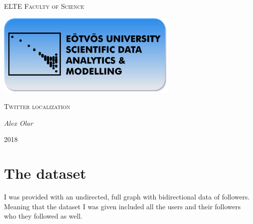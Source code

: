 \documentclass[a4paper,12pt]{article}
\begin{document}
\linespread{1.2}

\begin{titlepage}

	\centering
	{\scshape\LARGE ELTE Faculty of Science\par}
	\vspace{2cm}
	\includegraphics[width=0.66\textwidth]{./dslogo.png}
	\par\vspace{4cm}
	{\scshape\Large Twitter localization\par}
	\vspace{.5cm}
	{\large\itshape Alex Olar \par}
	\vfill
	{\large 2018 \par}

\end{titlepage}

\onehalfspacing

\begin{abstract}
	\par During the years the university has built a database 
	using Twitter's public API and collected more than 3 TB of
	data to analyze. I got access to this dataset and attempted
	to predict the location of users based on their followers'
	location.
	\par The problem itself is not a machine learning problem but
	an analytical approach and making assumptions about the behavior
	of users. Therefore I put an emphasis on visualization since the
	most crucial thing one does before any algorithmic solution
	is to analyze the visualized dataset.
\end{abstract}

\tableofcontents

\newpage

\section{The dataset}

\par I was provided with an undirected, full graph with bidirectional
data of followers. Meaning that the dataset I was given included all the
users and their followers who they followed as well. 
\end{document}

